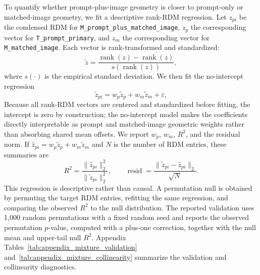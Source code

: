 \documentclass{article}
\begin{document}
To quantify whether prompt-plus-image geometry is closer to prompt-only or matched-image geometry, we fit a descriptive rank-RDM regression. Let \(z_{pi}\) be the condensed RDM for \texttt{M\_prompt\_plus\_matched\_image}, \(z_p\) the corresponding vector for \texttt{T\_prompt\_primary}, and \(z_m\) the corresponding vector for \texttt{M\_matched\_image}. Each vector is rank-transformed and standardized:
\begin{equation}
  \tilde z =
  \frac{\operatorname{rank}(z)-\overline{\operatorname{rank}(z)}}
  {s(\operatorname{rank}(z))},
  \label{eq:appendix_rank_standardize}
\end{equation}
where \(s(\cdot)\) is the empirical standard deviation. We then fit the no-intercept regression
\begin{equation}
  \tilde z_{pi} = w_p \tilde z_p + w_m \tilde z_m + \varepsilon,
  \label{eq:appendix_mixture}
\end{equation}
Because all rank-RDM vectors are centered and standardized before fitting, the intercept is zero by construction; the no-intercept model makes the coefficients directly interpretable as prompt and matched-image geometric weights rather than absorbing shared mean offsets. We report \(w_p\), \(w_m\), \(R^2\), and the residual norm. If \(\hat z_{pi}=w_p\tilde z_p+w_m\tilde z_m\) and \(N\) is the number of RDM entries, these summaries are
\begin{equation}
  R^2=\frac{\|\hat z_{pi}\|_2^2}{\|\tilde z_{pi}\|_2^2},
  \qquad
  \operatorname{resid}=
  \frac{\|\tilde z_{pi}-\hat z_{pi}\|_2}{\sqrt{N}}.
  \label{eq:appendix_mixture_summaries}
\end{equation}
This regression is descriptive rather than causal. A permutation null is obtained by permuting the target RDM entries, refitting the same regression, and comparing the observed \(R^2\) to the null distribution. The reported validation uses 1,000 random permutations with a fixed random seed and reports the observed permutation \(p\)-value, computed with a plus-one correction, together with the null mean and upper-tail null \(R^2\). Appendix Tables~\ref{tab:appendix_mixture_validation} and~\ref{tab:appendix_mixture_collinearity} summarize the validation and collinearity diagnostics.
\end{document}
